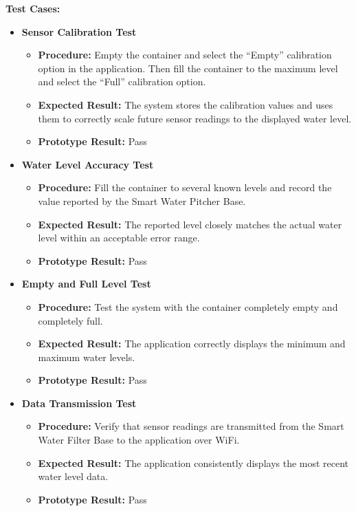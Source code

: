 \noindent{}\textbf{Test Cases:}
\begin{itemize}
\setlength{\itemsep}{0pt}
\setlength{\parskip}{0pt}
\setlength{\parsep}{0pt}
\setlength{\topsep}{0pt}

\item \textbf{Sensor Calibration Test}
\begin{itemize}
\item \textbf{Procedure:} Empty the container and select the “Empty” calibration option in the application. Then fill the container to the maximum level and select the “Full” calibration option.
\item \textbf{Expected Result:} The system stores the calibration values and uses them to correctly scale future sensor readings to the displayed water level.
\item \textbf{Prototype Result:} Pass
\end{itemize}

\item \textbf{Water Level Accuracy Test}
\begin{itemize}
\item \textbf{Procedure:} Fill the container to several known levels and record the value reported by the Smart Water Pitcher Base.
\item \textbf{Expected Result:} The reported level closely matches the actual water level within an acceptable error range.
\item \textbf{Prototype Result:} Pass
\end{itemize}

\item \textbf{Empty and Full Level Test}
\begin{itemize}
\item \textbf{Procedure:} Test the system with the container completely empty and completely full.
\item \textbf{Expected Result:} The application correctly displays the minimum and maximum water levels.
\item \textbf{Prototype Result:} Pass
\end{itemize}

\item \textbf{Data Transmission Test}
\begin{itemize}
\item \textbf{Procedure:} Verify that sensor readings are transmitted from the Smart Water Filter Base to the application over WiFi.
\item \textbf{Expected Result:} The application consistently displays the most recent water level data.
\item \textbf{Prototype Result:} Pass
\end{itemize}


\end{itemize}
